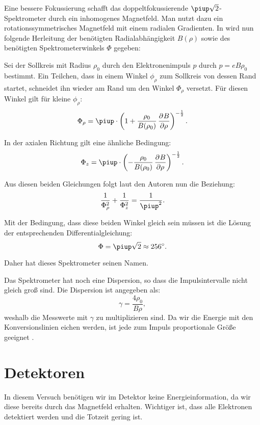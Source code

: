 \documentclass[11pt, ngerman, fleqn, DIV=15, headinclude, BCOR=2cm]{scrreprt}
\begin{document}
Eine bessere Fokussierung schafft das doppeltfokussierende $\piup \sqrt
2$-Spektrometer durch ein inhomogenes Magnetfeld. Man nutzt dazu
ein rotationssymmetrisches Magnetfeld mit einem radialen Gradienten. In
\parencite[§2.232]{Riezler/Kernphysikalisches} wird nun folgende Herleitung der
benötigten Radialabhängigkeit $B(\rho)$ sowie des benötigten
Spektrometerwinkels $\Phi$ gegeben:

Sei der Sollkreis mit Radius $\rho_0$ durch den Elektronenimpuls $p$ durch $p =
e B \rho_0$ bestimmt. Ein Teilchen, dass in einem Winkel $\phi_\rho$ zum
Sollkreis von dessen Rand startet, schneidet ihn wieder am Rand um den Winkel
$\Phi_\rho$ versetzt. Für diesen Winkel gilt für kleine $\phi_\rho$:
\parencite[(125)]{Riezler/Kernphysikalisches}
\[
    \Phi_\rho = \piup \cdot \del{1 + \frac{\rho_0}{B(\rho_0)} \dpd B
    \rho}^{-\frac 12}.
\]

In der axialen Richtung gilt eine ähnliche Bedingung:
\parencite[(126)]{Riezler/Kernphysikalisches}
\[
    \Phi_z = \piup \cdot \del{- \frac{\rho_0}{B(\rho_0)} \dpd B
    \rho}^{-\frac 12}.
\]

Aus diesen beiden Gleichungen folgt laut den Autoren nun die Beziehung:
\parencite[(127)]{Riezler/Kernphysikalisches}
\[
    \frac1{\Phi_\rho^2} + \frac1{\Phi_z^2} = \frac1{\piup^2}.
\]

Mit der Bedingung, dass diese beiden Winkel gleich sein müssen ist die Lösung
der entsprechenden Differentialgleichung:
\parencite[(129)]{Riezler/Kernphysikalisches}
\[
    \Phi = \piup \sqrt 2 \approx \SI{256}{\degree}.
\]

Daher hat dieses Spektrometer seinen Namen.

Das Spektrometer hat noch eine Dispersion, so dass die Impulsintervalle nicht
gleich groß sind. Die Dispersion ist angegeben als:
\parencite[(130)]{Riezler/Kernphysikalisches}
\[
    \gamma = \frac{4 \rho_0}{B \rho},
\]
weshalb die Messwerte mit $\gamma$ zu multiplizieren sind. Da wir die Energie
mit den Konversionslinien eichen werden, ist jede zum Impuls proportionale
Größe geeignet \parencite[§P523.5.4]{physik512-Anleitung}.

\section{Detektoren}

In diesem Versuch benötigen wir im Detektor keine Energieinformation, da wir
diese bereits durch das Magnetfeld erhalten. Wichtiger ist, dass alle
Elektronen detektiert werden und die Totzeit gering ist.
\end{document}

